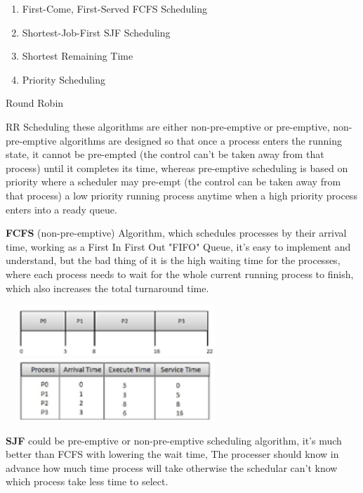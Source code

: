 \documentclass{article} %
\begin{document}
\begin{enumerate}
\item  First-Come, First-Served FCFS Scheduling

\item  Shortest-Job-First SJF Scheduling

\item  Shortest Remaining Time

\item  Priority Scheduling 
\end{enumerate}

\noindent     Round Robin 

\noindent RR Scheduling these algorithms are either non-pre-emptive or pre-emptive, non-pre-emptive algorithms are designed so that once a process enters the running state, it cannot be pre-empted (the control can't be taken away from that process) until it completes its time, whereas pre-emptive scheduling is based on priority where a scheduler may pre-empt (the control can be taken away from that process) a low priority running process anytime when a high priority process enters into a ready queue.

\noindent \textbf{FCFS }(non-pre-emptive) Algorithm, which schedules processes by their arrival time, working as a First In First Out "FIFO" Queue, it's easy to implement and understand, but the bad thing of it is the high waiting time for the processes, where each process needs to wait for the whole current running process to finish, which also increases the total turnaround time.

\noindent \includegraphics*[width=3.28in, height=0.75in, keepaspectratio=false]{image1}\includegraphics*[width=3.28in, height=0.92in, keepaspectratio=false]{image2}

\noindent \textbf{SJF }could be pre-emptive or non-pre-emptive scheduling algorithm, it's much better than FCFS with lowering the wait time, The processer should know in advance how much time process will take otherwise the schedular can't know which process take less time to select.
\end{document}
